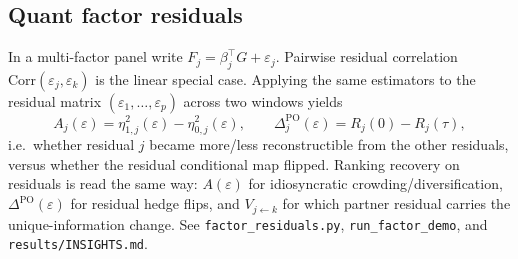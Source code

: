 \documentclass[11pt]{article}
\begin{document}
\subsection*{Quant factor residuals}

In a multi-factor panel write $F_j=\beta_j^\top G+\varepsilon_j$. Pairwise residual correlation
$\mathrm{Corr}(\varepsilon_j,\varepsilon_k)$ is the linear special case. Applying the same
estimators to the residual matrix $(\varepsilon_1,\ldots,\varepsilon_p)$ across two windows yields
\begin{equation}
A_j(\varepsilon)=\eta^{2}_{1,j}(\varepsilon)-\eta^{2}_{0,j}(\varepsilon),
\qquad
\Delta^{\mathrm{PO}}_j(\varepsilon)=R_j(0)-R_j(\tau),
\end{equation}
i.e.\ whether residual $j$ became more/less reconstructible from the other residuals, versus whether
the residual conditional map flipped. Ranking recovery on residuals is read the same way:
$A(\varepsilon)$ for idiosyncratic crowding/diversification, $\Delta^{\mathrm{PO}}(\varepsilon)$ for residual hedge flips,
and $V_{j\leftarrow k}$ for which partner residual carries the unique-information change.
See \texttt{factor\_residuals.py}, \texttt{run\_factor\_demo}, and \texttt{results/INSIGHTS.md}.
\end{document}
